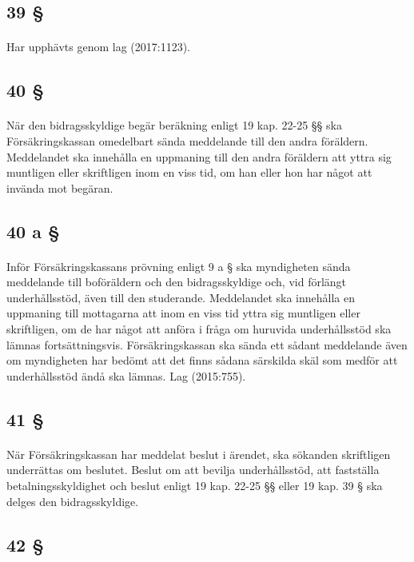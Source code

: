 \documentclass[a4paper,notitlepage,openany,10pt]{book}
\begin{document}
\subsection*{39 §}
\paragraph*{}
Har upphävts genom
lag (2017:1123).
\subsection*{40 §}
\paragraph*{}
När den bidragsskyldige begär beräkning enligt 19 kap. 22-25 §§ ska Försäkringskassan omedelbart sända meddelande till den andra föräldern. Meddelandet ska innehålla en uppmaning till den andra föräldern att yttra sig muntligen eller skriftligen inom en viss tid, om han eller hon har något att invända mot begäran.
\subsection*{40 a §}
\paragraph*{}
Inför Försäkringskassans prövning enligt 9 a § ska myndigheten sända meddelande till boföräldern och den bidragsskyldige och, vid förlängt underhållsstöd, även till den studerande. Meddelandet ska innehålla en uppmaning till mottagarna att inom en viss tid yttra sig muntligen eller skriftligen, om de har något att anföra i fråga om huruvida underhållsstöd ska lämnas fortsättningsvis. Försäkringskassan ska sända ett sådant meddelande även om myndigheten har bedömt att det finns sådana särskilda skäl som medför att underhållsstöd ändå ska lämnas.
Lag (2015:755).
\subsection*{41 §}
\paragraph*{}
När Försäkringskassan har meddelat beslut i ärendet, ska sökanden skriftligen underrättas om beslutet.
Beslut om att bevilja underhållsstöd, att fastställa betalningsskyldighet och beslut enligt 19 kap. 22-25 §§ eller 19 kap. 39 § ska delges den bidragsskyldige.
\subsection*{42 §}
\end{document}

